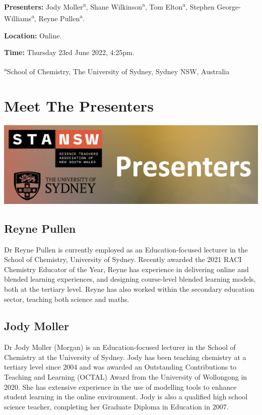 \documentclass[
]{book}
\begin{document}
\textbf{Presenters:} Jody Moller\textsuperscript{a}, Shane Wilkinson\textsuperscript{a}, Tom Elton\textsuperscript{a}, Stephen George-Williams\textsuperscript{a}, Reyne Pullen\textsuperscript{a}.

\textbf{Location:} Online.

\textbf{Time:} Thursday 23rd June 2022, 4:25pm.

\textsuperscript{a}School of Chemistry, The University of Sydney, Sydney NSW, Australia

\hypertarget{meet-the-presenters}{%
\chapter{Meet The Presenters}\label{meet-the-presenters}}

\includegraphics[width=26.31in]{images/Presenters}

\hypertarget{reyne-pullen}{%
\section*{Reyne Pullen}\label{reyne-pullen}}

Dr Reyne Pullen is currently employed as an Education-focused lecturer in the School of Chemistry, University of Sydney. Recently awarded the 2021 RACI Chemistry Educator of the Year, Reyne has experience in delivering online and blended learning experiences, and designing course-level blended learning models, both at the tertiary level. Reyne has also worked within the secondary education sector, teaching both science and maths.

\hypertarget{jody-moller}{%
\section*{Jody Moller}\label{jody-moller}}

Dr Jody Moller (Morgan) is an Education-focused lecturer in the School of Chemistry at the University of Sydney. Jody has been teaching chemistry at a tertiary level since 2004 and was awarded an Outstanding Contributions to Teaching and Learning (OCTAL) Award from the University of Wollongong in 2020. She has extensive experience in the use of modelling tools to enhance student learning in the online environment. Jody is also a qualified high school science teacher, completing her Graduate Diploma in Education in 2007.
\end{document}
